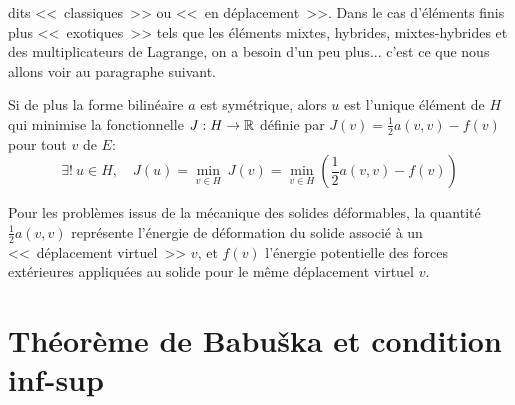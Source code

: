 \medskip
{} dits <<~classiques~>> ou <<~en déplacement~>>.
Dans le cas d'éléments finis plus <<~exotiques~>> tels que les éléments
mixtes, hybrides, mixtes-hybrides et des multiplicateurs de Lagrange, on a besoin d'un peu plus... c'est ce que nous allons voir au paragraphe suivant.


\begin{theoreme}
Si de plus la forme bilinéaire $a$ est symétrique, alors $u$ est
l'unique élément de $H$ qui minimise la fonctionnelle
$J: H\rightarrow\mathbb R$ définie par $J(v) = \frac12 a(v,v)-f(v)$ pour tout $v$ de $E$:
\begin{equation}
\exists!\ u \in H,\quad J(u) = \min_{v\in H}\ J(v) = \min_{v\in H} \left( \frac12 a(v,v) - f(v) \right)
\end{equation}
\end{theoreme}


\medskip



Pour les problèmes issus de la mécanique des solides déformables, la quantité $\frac12 a(v,v)$ représente l'énergie de déformation du solide associé à un <<~déplacement virtuel~>> $v$, et $f(v)$ l'énergie potentielle des forces extérieures appliquées au solide pour le même déplacement virtuel $v$.


\medskip
\section{Théorème de Babuška et condition inf-sup}\label{Sec-ThBabuska}




